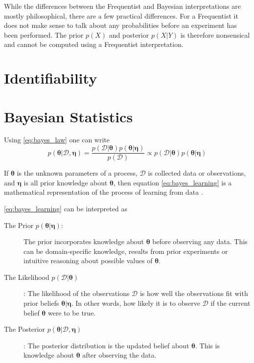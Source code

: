 While the differences between the Frequentist and Bayesian interpretations are mostly philosophical, there are a few practical differences. For a Frequentist it does not make sense to talk about any probabilities before an experiment has been performed. The prior $p(X)$ and posterior $p(X | Y)$ is therefore nonsensical and cannot be computed using a Frequentist interpretation.



\section{Identifiability}



\section{Bayesian Statistics}

Using \cref{eq:bayes_law} one can write 
\begin{equation}\label{eq:bayes_learning}
    p(\boldsymbol{\theta}| \mathcal{D}, \boldsymbol{\eta}) = \frac{p(\mathcal{D} | \boldsymbol{\theta}) p(\boldsymbol{\theta} | \boldsymbol{\eta})}{p(\mathcal{D})} \propto p(\mathcal{D} | \boldsymbol{\theta})p(\boldsymbol{\theta} | \boldsymbol{\eta})
\end{equation}

If $\boldsymbol{\theta}$ is the unknown parameters of a process, $\mathcal{D}$ is collected data or observations, and $\boldsymbol{\eta}$ is all prior knowledge about $\boldsymbol{\theta}$, then equation \eqref{eq:bayes_learning} is a mathematical representation of the process of learning from data \cite{Jaynes86bayesianmethods:}.

\cref{eq:bayes_learning} can be interpreted as
\begin{description}
    \item[The Prior $p(\boldsymbol{\theta} | \boldsymbol{\eta})$:] The prior incorporates knowledge about $\boldsymbol{\theta}$ before observing any data. This can be domain-specific knowledge, results from prior experiments or intuitive reasoning about possible values of $\boldsymbol{\theta}$. 
    \item[The Likelihood $p(\mathcal{D} | \boldsymbol{\theta})$]: The likelihood of the observations $\mathcal{D}$ is how well the observations fit with prior beliefs $\boldsymbol{\theta} | \boldsymbol{\eta}$. In other words, how likely it is to observe $\mathcal{D}$ if the current belief $\boldsymbol{\theta}$ were to be true.
    \item[The Posterior $p(\boldsymbol{\theta} | \mathcal{D}, \boldsymbol{\eta})$]: The posterior distribution is the updated belief about $\boldsymbol{\theta}$. This is knowledge about $\boldsymbol{\theta}$ after observing the data. 
\end{description}

